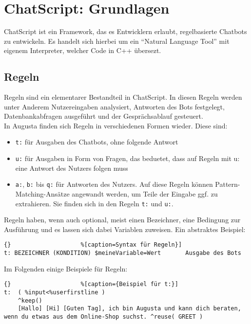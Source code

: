 \chapter{ChatScript: Grundlagen}
\label{sec:ChatScript: Grundlagen}

ChatScript ist ein Framework, das es Entwicklern erlaubt, regelbasierte Chatbots zu entwickeln. Es handelt sich hierbei um  ein "`Natural Language Tool"' mit eigenem Interpreter, welcher Code in C++ übersezt. 


\section{Regeln}
\label{sec:ChatScript: Regeln}

Regeln sind ein elementarer Bestandteil in ChatScript. In diesen Regeln werden unter Anderem Nutzereingaben analysiert, Antworten des Bots festgelegt, Datenbankabfragen ausgeführt und der Gesprächsablauf gesteuert.\\
In Augusta finden sich Regeln in verschiedenen Formen wieder. Diese sind: 

\begin{itemize}
\item {\lstinline|t:|  für Ausgaben des Chatbots, ohne folgende Antwort}
\item {\lstinline|u:|  für Ausgaben in Form von Fragen, das beduetet, dass auf Regeln mit u: eine Antwort des Nutzers folgen muss} 
\item {\lstinline|a:|, \lstinline|b:| bis \lstinline|q:|  für Antworten des Nutzers. Auf diese Regeln können Pattern-Matching-Ansätze angewandt werden, um Teile der Eingabe ggf. zu extrahieren. Sie finden sich in den Regeln \lstinline|t:| und \lstinline|u:|.}
\end{itemize}

Regeln haben, wenn auch  optional, meist einen Bezeichner, eine Bedingung zur Ausführung und es lassen sich dabei Variablen zuweisen. Ein abstraktes Beispiel:

\begin{lstlisting}{}					%[caption=Syntax für Regeln}]
t: BEZEICHNER (KONDITION) $meineVariable=Wert		Ausgabe des Bots
\end{lstlisting}

Im Folgenden einige Beispiele für Regeln:

\begin{lstlisting}{}					%[caption={Beispiel für t:}]
t:  ( %input<%userfirstline )
    ^keep()
    [Hallo] [Hi] [Guten Tag], ich bin Augusta und kann dich beraten, wenn du etwas aus dem Online-Shop suchst. ^reuse( GREET )
\end{lstlisting}

